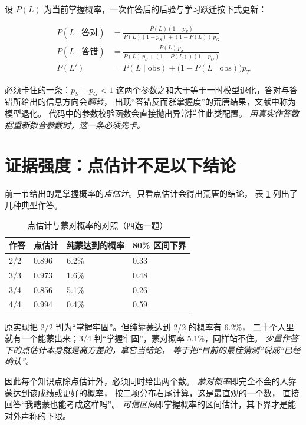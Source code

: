 设 $P(L)$ 为当前掌握概率，一次作答后的后验与学习跃迁按下式更新：

\begin{align}
P(L \mid \text{答对}) &= \frac{P(L)(1-p_S)}{P(L)(1-p_S) + (1-P(L))\,p_G} \\[2pt]
P(L \mid \text{答错}) &= \frac{P(L)\,p_S}{P(L)\,p_S + (1-P(L))(1-p_G)} \\[2pt]
P(L') &= P(L \mid \text{obs}) + \bigl(1 - P(L \mid \text{obs})\bigr)p_T
\end{align}

\begin{keynote}{必须卡住的一条：$p_S + p_G < 1$}
这两个参数之和大于等于一时模型退化，答对与答错所给出的信息方向会\emph{翻转}，
出现“答错反而涨掌握度”的荒唐结果，文献中称为模型退化。
代码中的参数校验函数会直接抛出异常拦住此类配置。
\emph{用真实作答数据重新拟合参数时，这一条必须先卡。}
\end{keynote}

\section{证据强度：点估计不足以下结论}

前一节给出的是掌握概率的\emph{点估计}。只看点估计会得出荒唐的结论，
表 \ref{tab:luck} 列出了几种典型作答。

\begin{table}[htbp]\centering\small
\caption{点估计与蒙对概率的对照（四选一题）}\label{tab:luck}
\begin{tabular}{@{}p{1.6cm}p{2.2cm}p{2.6cm}p{5cm}@{}}
\toprule
作答 & 点估计 & 纯蒙达到的概率 & 80\% 区间下界 \\
\midrule
2/2 & 0.896 & 6.2\% & 0.33 \\
3/3 & 0.973 & 1.6\% & 0.48 \\
3/4 & 0.856 & 5.1\% & 0.26 \\
4/4 & 0.994 & 0.4\% & 0.59 \\
\bottomrule
\end{tabular}
\end{table}

原实现把 2/2 判为“掌握牢固”。但纯靠蒙达到 2/2 的概率有 6.2\%，
二十个人里就有一个能蒙出来；3/4 判“掌握牢固”，蒙对概率 5.1\%，同样站不住。
\emph{少量作答下的点估计本身就是高方差的，拿它当结论，
等于把“目前的最佳猜测”说成“已经确认”。}

因此每个知识点除点估计外，必须同时给出两个数。
\emph{蒙对概率}即完全不会的人靠蒙达到该成绩或更好的概率，
按二项分布右尾计算，这是最直观的一个数，
直接回答“我瞎蒙也能考成这样吗”。
\emph{可信区间}即掌握概率的区间估计，其下界才是能对外声称的下限。

